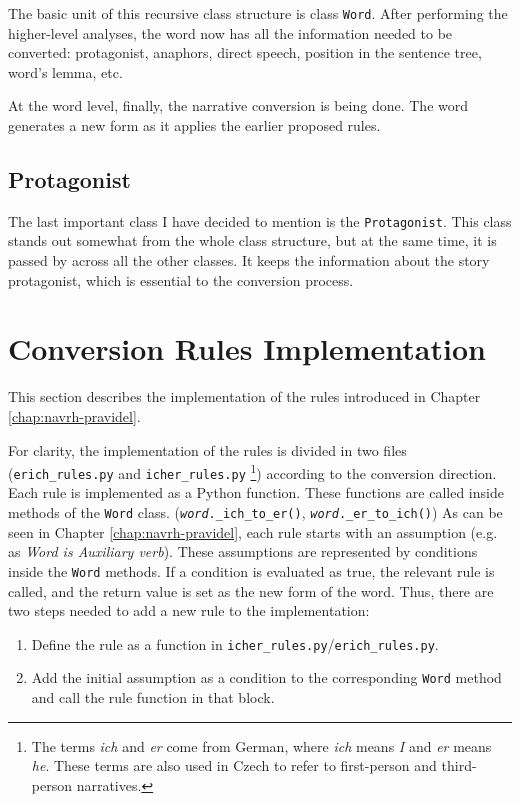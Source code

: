 The basic unit of this recursive class structure is class \texttt{Word}. After performing the higher-level analyses, the word now has all the information needed to be converted: protagonist, anaphors, direct speech, position in the sentence tree, word's lemma, etc.

At the word level, finally, the narrative conversion is being done. The word generates a new form as it applies the earlier proposed rules.

\subsection{Protagonist}

The last important class I have decided to mention is the \texttt{Protagonist}. This class stands out somewhat from the whole class structure, but at the same time, it is passed by across all the other classes. It keeps the information about the story protagonist, which is essential to the conversion process.

\section{Conversion Rules Implementation}

This section describes the implementation of the rules introduced in Chapter \ref{chap:navrh-pravidel}.

For clarity, the implementation of the rules is divided in two files (\texttt{erich\_rules.py} and \texttt{icher\_rules.py} \footnote{The terms \emph{ich} and \emph{er} come from German, where \emph{ich} means \emph{I} and \emph{er} means \emph{he}. These terms are also used in Czech to refer to first-person and third-person narratives.})  according to the conversion direction. Each rule is implemented as a Python function. These functions are called inside methods of the \texttt{Word} class. (\texttt{\emph{word}.\_ich\_to\_er()}, \texttt{\emph{word}.\_er\_to\_ich()})
As can be seen in Chapter \ref{chap:navrh-pravidel}, each rule starts with an assumption (e.g. as \emph{Word is Auxiliary verb}). These assumptions are represented by conditions inside the \texttt{Word} methods. If a condition is evaluated as true, the relevant rule is called, and the return value is set as the new form of the word.
Thus, there are two steps needed to add a new rule to the implementation:

\begin{enumerate}
	\item Define the rule as a function in \texttt{icher\_rules.py}/\texttt{erich\_rules.py}.
	\item Add the initial assumption as a condition to the corresponding \texttt{Word} method and call the rule function in that block.
\end{enumerate}

